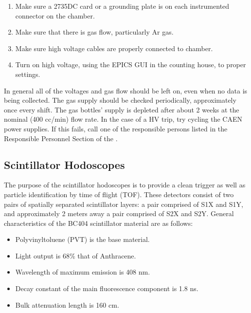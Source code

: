 \begin{enumerate}
\item {Make sure a 2735DC card or a grounding plate is on each instrumented
connector on the chamber.}
\item {Make sure that there is gas flow, particularly Ar gas.}
\item {Make sure high voltage cables are properly connected to
chamber.}
\item {Turn on high voltage, using the EPICS GUI in the counting house,
to proper settings.}
\end{enumerate}


In general all of the voltages and gas flow should be left on, even when
no data is being collected.  The gas supply should be checked periodically,
approximately once every shift.  The gas bottles' supply is depleted
after about 2 weeks at the nominal (400 cc/min) flow rate.
In the case of a HV trip, try cycling the CAEN power supplies.  If this fails, call
one of the responsible persons listed in the Responsible Personnel Section
of the .




\subsection{Scintillator Hodoscopes}

The purpose of the scintillator hodoscopes is to provide a clean
trigger as well as particle identification by time of flight (TOF). These
detectors consist of two pairs of spatially separated scintillator
layers: a pair comprised of S1X and S1Y, and approximately 2 meters away a pair
comprised of S2X and S2Y. General characteristics of the BC404 scintillator
material are as follows:

\begin{itemize}
\item{Polyvinyltoluene (PVT) is the base material. }
\item{Light output is 68\% that of Anthracene. }
\item{Wavelength of maximum emission is 408 nm.}
\item{Decay constant of the main fluorescence component is 1.8 ns.}
\item{Bulk attenuation length is 160 cm.}
\end{itemize}

